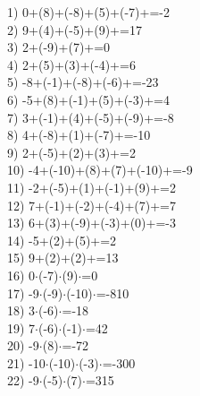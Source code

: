 \documentclass[a4paper,10pt]{article}
\begin{document}
1)   0+(8)+(-8)+(5)+(-7)+=-2
\vspace{0.5cm}\\2)   9+(4)+(-5)+(9)+=17
\vspace{0.5cm}\\3)   2+(-9)+(7)+=0
\vspace{0.5cm}\\4)   2+(5)+(3)+(-4)+=6
\vspace{0.5cm}\\5)   -8+(-1)+(-8)+(-6)+=-23
\vspace{0.5cm}\\6)   -5+(8)+(-1)+(5)+(-3)+=4
\vspace{0.5cm}\\7)   3+(-1)+(4)+(-5)+(-9)+=-8
\vspace{0.5cm}\\8)   4+(-8)+(1)+(-7)+=-10
\vspace{0.5cm}\\9)   2+(-5)+(2)+(3)+=2
\vspace{0.5cm}\\10)   -4+(-10)+(8)+(7)+(-10)+=-9
\vspace{0.5cm}\\11)   -2+(-5)+(1)+(-1)+(9)+=2
\vspace{0.5cm}\\12)   7+(-1)+(-2)+(-4)+(7)+=7
\vspace{0.5cm}\\13)   6+(3)+(-9)+(-3)+(0)+=-3
\vspace{0.5cm}\\14)   -5+(2)+(5)+=2
\vspace{0.5cm}\\15)   9+(2)+(2)+=13
\vspace{0.5cm}\\16)   0$\cdot$(-7)$\cdot$(9)$\cdot$=0
\vspace{0.5cm}\\17)   -9$\cdot$(-9)$\cdot$(-10)$\cdot$=-810
\vspace{0.5cm}\\18)   3$\cdot$(-6)$\cdot$=-18
\vspace{0.5cm}\\19)   7$\cdot$(-6)$\cdot$(-1)$\cdot$=42
\vspace{0.5cm}\\20)   -9$\cdot$(8)$\cdot$=-72
\vspace{0.5cm}\\21)   -10$\cdot$(-10)$\cdot$(-3)$\cdot$=-300
\vspace{0.5cm}\\22)   -9$\cdot$(-5)$\cdot$(7)$\cdot$=315
\end{document}

